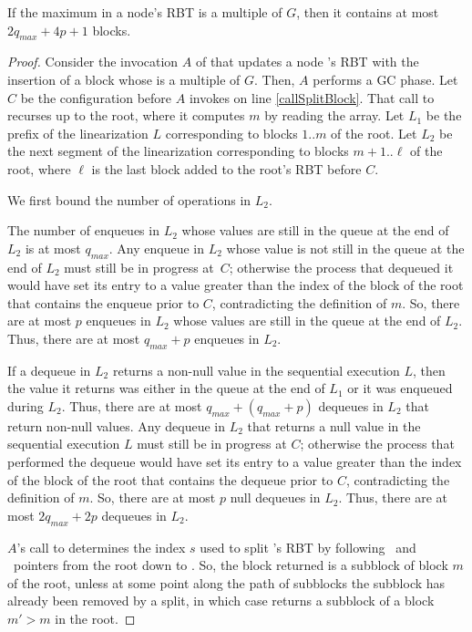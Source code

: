\begin{lemma}\label{boundAfterGC}
If the maximum  in a node's RBT is a multiple of $G$, then
it contains at most $2q_{max}+4p+1$ blocks.
\end{lemma}
\begin{proof}
Consider the invocation $A$ of  that updates a node 's RBT with the insertion of a block whose 
 is a multiple of $G$.
Then, $A$ performs a GC phase.
Let $C$ be the configuration before $A$ invokes  on line \ref{callSplitBlock}.
That call to  recurses up to the root, where it computes $m$ by reading the 
array.
Let $L_1$ be the prefix of the linearization $L$ corresponding to blocks $1..m$ of the root.
Let $L_2$ be the next segment of the linearization corresponding to blocks $m+1..\ell$ of the root, where
$\ell$ is the last block added to the root's RBT before $C$.

We first bound the number of operations in $L_2$.

The number of enqueues in $L_2$ whose values are still in the queue at the end of $L_2$ is at most $q_{max}$.
Any enqueue in $L_2$ whose value is not still in the queue at the end of $L_2$
must still be in progress at~$C$; otherwise the process that dequeued it would have
set its  entry to a value greater than the index of the block of the root that contains the enqueue prior to $C$,
contradicting the definition of $m$.
So, there are at most $p$ enqueues in $L_2$ whose values are still in the queue at the end of $L_2$.
Thus, there are at most $q_{max}+p$ enqueues in $L_2$.

If a dequeue in $L_2$ returns a non-null value in the sequential execution $L$,
then the value it returns was either in the queue at the end of $L_1$ or it was enqueued during $L_2$.
Thus, there are at most $q_{max}+(q_{max}+p)$ dequeues in $L_2$ that return non-null values.
Any dequeue in $L_2$ that returns a null value in the sequential execution $L$ must still be in progress
at $C$; otherwise the process that performed the dequeue would have set its  entry
to a value greater than the index of the block of the root that contains the dequeue prior to $C$, 
contradicting the definition of $m$.
So, there are at most $p$ null dequeues in $L_2$.
Thus, there are at most $2q_{max} + 2p$ dequeues in $L_2$.

$A$'s call to  determines the index $s$ used to split 's RBT by following 
\eleft\ and \eright\ pointers from the root down to .
So, the block returned is a subblock of block $m$ of the root, unless
at some point along the path of subblocks the subblock has already been removed by a split,
in which case  returns a subblock of a block $m'>m$ in the root.


\end{proof}

